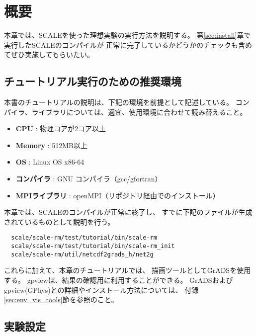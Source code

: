 
\section{概要}

本章では、SCALEを使った理想実験の実行方法を説明する。
第\ref{sec:install}章で実行したSCALEのコンパイルが
正常に完了しているかどうかのチェックも含めてぜひ実施してもらいたい。


\subsection{チュートリアル実行のための推奨環境}
\label{sec:assumed_env}

本書のチュートリアルの説明は、下記の環境を前提として記述している。
コンパイラ、ライブラリについては、適宜、使用環境に合わせて読み替えること。

\begin{itemize}
 \item {\bf CPU} : 物理コアが2コア以上 %
 \item {\bf Memory} : 512MB以上 %
 \item {\bf OS} : Linux OS x86-64  %
 \item {\bf コンパイラ} : GNU コンパイラ（gcc/gfortran）
 \item {\bf MPIライブラリ} : openMPI（リポジトリ経由でのインストール）
\end{itemize}

本章では、SCALEのコンパイルが正常に終了し、
すでに下記のファイルが生成されているものとして説明を行う。
\begin{verbatim} 
  scale/scale-rm/test/tutorial/bin/scale-rm
  scale/scale-rm/test/tutorial/bin/scale-rm_init
  scale/scale-rm/util/netcdf2grads_h/net2g
\end{verbatim}
これらに加えて、本章のチュートリアルでは、
描画ツールとしてGrADSを使用する。
gpviewは、結果の確認用に利用することができる。
GrADSおよびgpview(GPhys)との詳細やインストール方法については、
付録 \ref{sec:env_vis_tools}節を参照のこと。


\subsection{実験設定}

